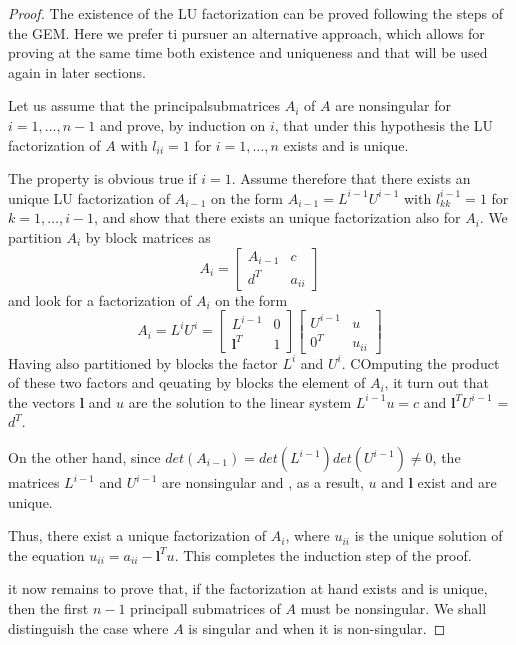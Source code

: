 \documentclass{article}
\theoremstyle{remark}
\begin{document}
  \begin{proof}
    The existence of the LU factorization can be proved following the steps of the GEM. Here we prefer ti pursuer an alternative approach, which allows for proving at the same time both existence and uniqueness and that will be used again in later sections.
    \par
    Let us assume that the principalsubmatrices $A_{i}$ of $A$ are nonsingular for $i = 1, \ldots, n-1$ and prove, by induction on $i$, that under this hypothesis the LU factorization of $A$ with $l_{ii} = 1$ for $i = 1, \ldots, n$ exists and is unique. 
    \par
    The property is obvious true if $i=1$. Assume therefore that there exists an unique LU factorization of $A_{i-1}$ on the form $A_{i-1} = L^{i-1} U^{i-1} $ with $l_{kk}^{i-1} = 1$  for $k = 1, \ldots , i-1$, and show that there exists an unique factorization also for $A_{i}$. We partition $A_{i}$ by block matrices as \[
    A_{i} = \begin{bmatrix} 
      A_{i-1} & c \\
      d^{T} & a_{ii}
    \end{bmatrix} 
    \] 
    and look for a factorization of $A_{i}$ on the form  \[
    A_{i} = L^{i} U^{i} = 
    \begin{bmatrix} 
      L^{i-1} & 0 \\
      \mathbf{l}^{T} & 1
    \end{bmatrix} 
    \begin{bmatrix} 
      U^{i-1} & u \\
      0^{T} & u_{ii}
    \end{bmatrix} 
    \] 
    Having also partitioned by blocks the factor $ L^{i}$ and $U^{i}$.  COmputing the product of these two factors and qeuating by blocks the element of $A_{i}$, it turn out that the vectors $\mathbf{l}$ and $u$ are the solution to the linear system $L^{i-1}u = c$ and $\mathbf{l}^{T} U^{i-1}$ = $d^{T}$. 
    \par
    On the other hand, since $det\left( A_{i-1} \right) =  det\left( L^{i-1} \right) det\left( U^{i-1} \right) \neq 0$, the matrices $L^{i-1}$ and $U^{i-1}$ are nonsingular and , as a result, $u$ and $\mathbf{l}$ exist and are unique.
    \par
    Thus, there exist a unique factorization of $A_{i}$, where $u_{ii}$ is the unique solution of the equation $u_{ii} = a_{ii} - \mathbf{l}^{T} u$. This completes the induction step of the proof.
    \par
    it now remains to prove that, if the factorization at hand exists and is unique,  then the first $n-1$ principall submatrices of $A$ must be nonsingular. We shall distinguish the case where $A$ is singular and when it is non-singular.

\end{proof}
\end{document}

